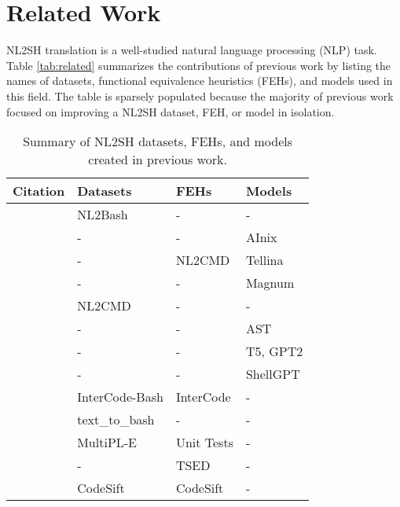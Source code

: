 \section{Related Work}
\label{sec:related-work}
NL2SH translation is a well-studied natural language processing (NLP) task. Table \ref{tab:related} summarizes the contributions of previous work by listing the names of datasets, functional equivalence heuristics (FEHs), and models used in this field. The table is sparsely populated because the majority of previous work focused on improving a NL2SH dataset, FEH, or model in isolation.

\begin{table}[ht!]
  \scriptsize
  \setlength{\tabcolsep}{2pt}
  \centering
  \caption{Summary of NL2SH datasets, FEHs, and models created in previous work.}
  \begin{tabular}{llll}
    \hline
    \textbf{Citation}       & \textbf{Datasets} & \textbf{FEHs} & \textbf{Models}  \\ \hline
    \citet{NL2Bash}         & NL2Bash           & -             & -                \\
    \citet{AInix}           & -                 & -             & AInix            \\
    \citet{NL2CMD-Comp}     & -                 & NL2CMD        & Tellina          \\
    \citet{Magnum}          & -                 & -             & Magnum           \\
    \citet{dataset2}        & NL2CMD            & -             & -                \\
    \citet{AST}             & -                 & -             & AST              \\
    \citet{finetune}        & -                 & -             & T5, GPT2         \\
    \citet{ShellGPT}        & -                 & -             & ShellGPT         \\
    \citet{InterCode}       & InterCode-Bash    & InterCode     & -                \\
    \citet{dataset4}        & text\_to\_bash    & -             & -                \\
    \citet{multiple}        & MultiPL-E         & Unit Tests    & -                \\
    \citet{tsed}            & -                 & TSED          & -                \\
    \citet{codesift}        & CodeSift          & CodeSift      & -                \\

\end{tabular}
\end{table}
